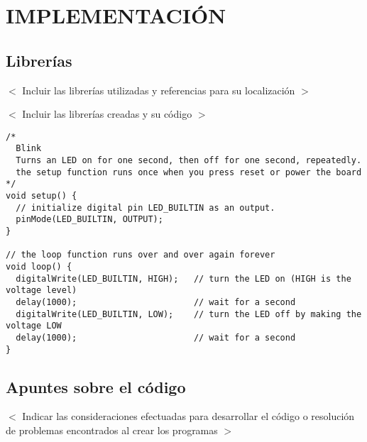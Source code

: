 \chapter{IMPLEMENTACIÓN}

\section{Librerías}
$<$ Incluir las librerías utilizadas y referencias para su localización $>$

$<$ Incluir las librerías creadas y su código $>$

\begin{verbatim}
/*
  Blink
  Turns an LED on for one second, then off for one second, repeatedly.
  the setup function runs once when you press reset or power the board
*/
void setup() {
  // initialize digital pin LED_BUILTIN as an output.
  pinMode(LED_BUILTIN, OUTPUT);
}

// the loop function runs over and over again forever
void loop() {
  digitalWrite(LED_BUILTIN, HIGH);   // turn the LED on (HIGH is the voltage level)
  delay(1000);                       // wait for a second
  digitalWrite(LED_BUILTIN, LOW);    // turn the LED off by making the voltage LOW
  delay(1000);                       // wait for a second
}
\end{verbatim}
\section{Apuntes sobre el código}

$<$ Indicar las consideraciones efectuadas para desarrollar el código o resolución de problemas encontrados al crear los programas $>$
